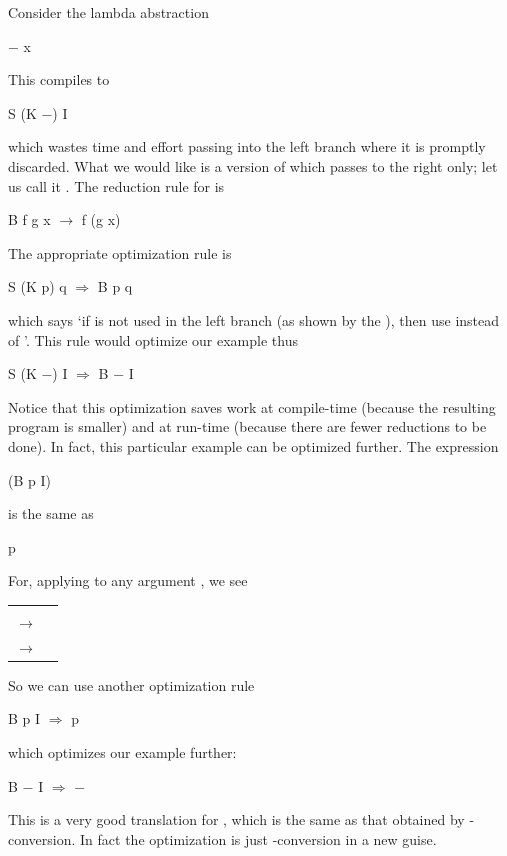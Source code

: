 Consider the lambda abstraction
\begin{mlcoded}
    $-$ x
\end{mlcoded}
This compiles to
\begin{mlcoded}
    S (K $-$) I
\end{mlcoded}
which wastes time and effort passing  into the left branch  where it is
promptly discarded. What we would like is a version of  which passes  to the
right only; let us call it . The reduction rule for  is
\begin{mlcoded}
    B f g x $\rightarrow$ f (g x)
\end{mlcoded}
The appropriate optimization rule is
\begin{mlcoded}
    S (K p) q $\Rightarrow$ B p q
\end{mlcoded}
which says `if  is not used in the left branch (as shown by the ), then use 
instead of '. This rule would optimize our example thus
\begin{mlcoded}
    S (K $-$) I $\Rightarrow$ B $-$ I
\end{mlcoded}

Notice that this optimization saves work at compile-time (because the
resulting program is smaller) and at run-time (because there are fewer
reductions to be done). In fact, this particular example can be optimized
further. The expression
\begin{mlcoded}
    (B p I)
\end{mlcoded}
is the same as
\begin{mlcoded}
    p
\end{mlcoded}
For, applying  to any argument , we see
\begin{mlcoded}
    \begin{tabular}{ll}
        & \ml{B p I x} \\
        $\rightarrow$ & \ml{p (I x)} \\
        $\rightarrow$ & \ml{p x}
    \end{tabular}
\end{mlcoded}
So we can use another optimization rule
\begin{mlcoded}
    B p I $\Rightarrow$ p
\end{mlcoded}
which optimizes our example further:
\begin{mlcoded}
    B $-$ I $\Rightarrow$ $-$
\end{mlcoded}

This is a very good translation for , which is the same as that
obtained by \ml{\te{}}-conversion. In fact the  optimization is just  \ml{\te{}}-conversion
in a new guise.

